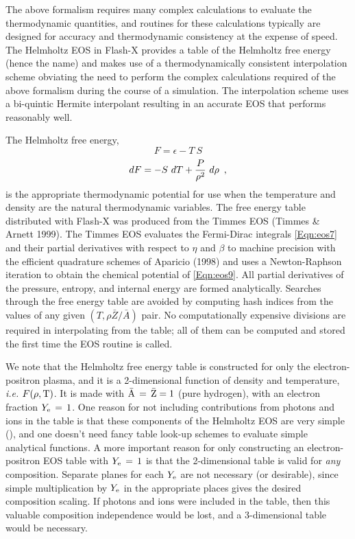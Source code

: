 The above formalism requires many complex calculations to evaluate the
thermodynamic quantities, and routines for these calculations
typically are designed for accuracy and thermodynamic consistency at
the expense of speed. The Helmholtz EOS in Flash-X provides a table of
the Helmholtz free energy (hence the name) and makes use of a
thermodynamically consistent interpolation scheme
obviating the need to perform the complex
calculations required of the above formalism during the course of a
simulation. The interpolation scheme uses a bi-quintic Hermite
interpolant resulting in an accurate EOS that performs
reasonably well.

The Helmholtz free energy,
\begin{equation}
\label {Eqn:eos13a}
F = \epsilon - T \ S
\end{equation}
\begin{equation}
\label {Eqn:eos13b}
dF = -S \ dT + {P \over \rho^2} \ d\rho
\enskip ,
\end{equation}
is the appropriate thermodynamic potential for use when the
temperature and density are the natural thermodynamic variables.  The
free energy table distributed with Flash-X was produced from the Timmes
EOS (Timmes \& Arnett 1999). The Timmes EOS evaluates the Fermi-Dirac
integrals \eqref{Eqn:eos7} and their partial derivatives with
respect to $\eta$ and $\beta$ to machine precision with the efficient
quadrature schemes of Aparicio (1998) and uses a Newton-Raphson
iteration to obtain the chemical potential of \eqref{Eqn:eos9}.
All partial derivatives of the pressure, entropy, and internal energy
are formed analytically.  Searches through the free energy table are
avoided by computing hash indices from the values of any given
$(T,\rho \bar{Z}/\bar{A})$ pair.  No computationally expensive
divisions are required in interpolating from the table; all of them
can be computed and stored the first time the EOS routine is called.

We note that the Helmholtz free energy table is constructed for only
the electron-positron plasma, and it is a 2-dimensional function of
density and temperature, {\it i.e.} $F(\rho,{\rm T})$. It is made with
${\bar {\rm A}} \, = \, {\bar {\rm Z}} = 1$ (pure hydrogen), with an
electron fraction $Y_{\rm e} \, = \, 1$.  One
reason for not including contributions from photons and ions in the
table is that these components of the Helmholtz EOS are very simple
(), and one doesn't need fancy table
look-up schemes to evaluate simple analytical functions.  A more
important reason for only constructing an electron-positron EOS table
with $Y_{\rm e} \, = \, 1$ is that the 2-dimensional table is valid
for {\it any\/} composition. Separate planes for each $Y_{\rm e}$ are
not necessary (or desirable), since simple multiplication by $Y_{\rm
e}$ in the appropriate places gives the desired composition
scaling. If photons and ions were included in the table, then this
valuable composition independence would be lost, and a 3-dimensional
table would be necessary.


